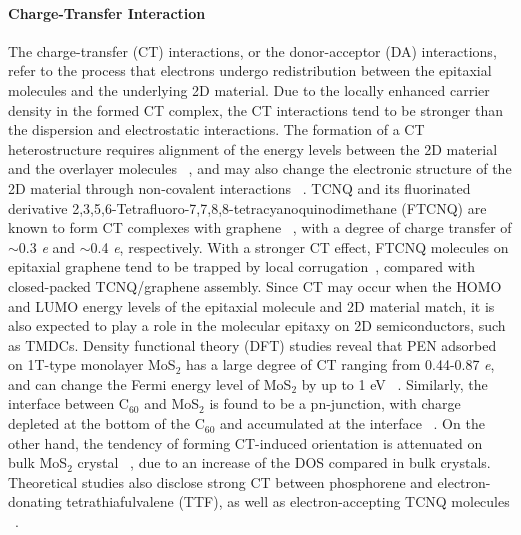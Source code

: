 \paragraph{Charge-Transfer Interaction}
\label{sec:orgebfad7b}

The charge-transfer (CT) interactions, or the donor-acceptor (DA)
interactions, refer to the process that electrons undergo
redistribution between the epitaxial molecules and the underlying 2D
material. Due to the locally enhanced carrier density in the formed CT
complex, the CT interactions tend to be stronger than the dispersion
and electrostatic interactions. The formation of a CT heterostructure
requires alignment of the energy levels between the 2D material and
the overlayer molecules ~\autocite{Akiyoshi_2015_DA}, and may also change
the electronic structure of the 2D material through non-covalent
interactions
~\autocite{Cai_2015_doping_2D_rev,Wehling_2008_doping,Zhang_2011_rev_pipi_gr}.
TCNQ and its fluorinated derivative
2,3,5,6-Tetra\-fluoro-7,7,8,8-tetra\-cyanoquino\-dimethane (FTCNQ) are
known to form CT complexes with graphene
~\autocite{Chen_2007_tcnq_gr_transfer,Voggu_2008_TCNQ,Barja_2010_assembl_donor_gr},
with a degree of charge transfer of $\sim{}$0.3 \textit{e} and
$\sim{}$0.4 \textit{e}, respectively. With a stronger CT effect, FTCNQ
molecules on epitaxial graphene tend to be trapped by local
corrugation~\autocite{Barja_2010_assembl_donor_gr}, compared with
closed-packed TCNQ/graphene assembly.  Since CT may occur when the
HOMO and LUMO energy levels of the epitaxial molecule and 2D material
match, it is also expected to play a role in the molecular epitaxy on
2D semiconductors, such as TMDCs. Density functional theory (DFT)
studies reveal that PEN adsorbed on 1T-type monolayer
MoS\(_{\text{2}}\) has a large degree of CT ranging from 0.44-0.87
\emph{e}, and can change the Fermi energy level of MoS\(_{\text{2}}\)
by up to 1 eV ~\autocite{Shen_2017_DFT_mos2_pent}. Similarly, the
interface between C\(_{\text{60}}\) and MoS\(_{\text{2}}\) is found to
be a pn-junction, with charge depleted at the bottom of the
C\(_{\text{60}}\) and accumulated at the interface
~\autocite{Chen_2016_c60_mos2}. On the other hand, the tendency of forming
CT-induced orientation is attenuated on bulk MoS\(_{\text{2}}\)
crystal ~\autocite{Sakurai_1991_c60_mos2}, due to an increase of the DOS
compared in bulk crystals. Theoretical studies also disclose strong CT
between phosphorene and electron-donating tetrathiafulvalene (TTF), as
well as electron-accepting TCNQ molecules
~\autocite{Zhang_2015_DA_phosphorene}.



